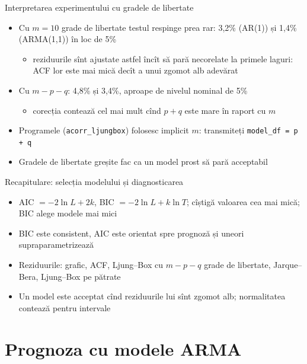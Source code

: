 \begin{frame}{Interpretarea experimentului cu gradele de libertate}
\itemsize{\small}
\begin{itemize}
    \item Cu $m = 10$ grade de libertate testul respinge prea rar: 3{,}2\% (AR(1)) și 1{,}4\% (ARMA(1,1)) în loc de 5\%
    \begin{itemize}
        \item reziduurile sînt ajustate astfel încît să pară necorelate la primele laguri: ACF lor este mai mică decît a unui zgomot alb adevărat
    \end{itemize}
    \item Cu $m - p - q$: 4{,}8\% și 3{,}4\%, aproape de nivelul nominal de 5\%
    \begin{itemize}
        \item corecția contează cel mai mult cînd $p + q$ este mare în raport cu $m$
    \end{itemize}
    \item Programele (\texttt{acorr\_ljungbox}) folosesc implicit $m$: transmiteți \texttt{model\_df = p + q}
    \item Gradele de libertate greșite fac ca un model prost să pară acceptabil
\end{itemize}
\end{frame}

\begin{frame}{Recapitulare: selecția modelului și diagnosticarea}
\itemsize{\small}
\begin{itemize}
    \item AIC $= -2\ln L + 2k$, BIC $= -2\ln L + k\ln T$; cîștigă valoarea cea mai mică; BIC alege modele mai mici
    \item BIC este consistent, AIC este orientat spre prognoză și uneori supraparametrizează
    \item Reziduurile: grafic, ACF, Ljung--Box cu $m - p - q$ grade de libertate, Jarque--Bera, Ljung--Box pe pătrate
    \item Un model este acceptat cînd reziduurile lui sînt zgomot alb; normalitatea contează pentru intervale
\end{itemize}
\end{frame}


\section{Prognoza cu modele ARMA}

